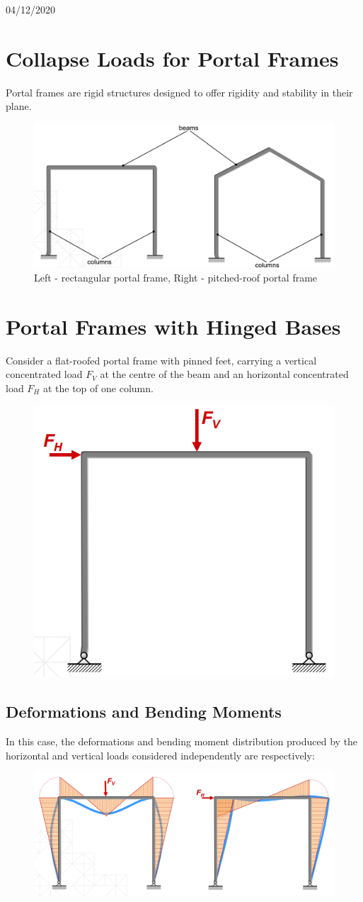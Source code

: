 \documentclass[class=report, crop=false, 12pt,a4paper]{standalone}
\begin{document}
\begin{center}
  04/12/2020
\end{center}
\section{Collapse Loads for Portal Frames}
Portal frames are rigid structures designed to offer rigidity and stability in their plane.
\begin{figure}[H]
  \centering
  \includegraphics[width = 0.8 \textwidth]{../img/beam31.PNG}
  \caption{Left - rectangular portal frame, Right - pitched-roof portal frame}
\end{figure}
\section{Portal Frames with Hinged Bases}
Consider a flat-roofed portal frame with pinned feet, carrying a vertical concentrated load $F_V$ at the centre of the beam and an horizontal concentrated load $F_H$ at the top of one column.
\begin{figure}[H]
  \centering
  \includegraphics[width = 0.4 \textwidth]{../img/beam32.PNG}
\end{figure}
\subsection{Deformations and Bending Moments}
In this case, the deformations and bending moment distribution produced by the horizontal and vertical loads considered independently are respectively:
\begin{figure}[H]
  \centering
  \includegraphics[width = 0.9 \textwidth]{../img/beam33.PNG}
\end{figure}
\end{document}
